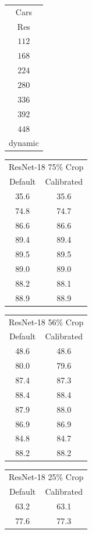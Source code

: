 \begin{table}[t]
    \centering
    \begin{tabular}{c|}
    Cars \\
    Res \\
    \hline
    $112$ \\ 
    $168$ \\ 
    $224$ \\ 
    $280$ \\ 
    $336$ \\ 
    $392$ \\ 
    $448$ \\
    dynamic\\
    \end{tabular}
    \begin{tabular}{|c|c|}
    \multicolumn{2}{|c|}{ ResNet-18 75\% Crop}\\
    Default & Calibrated \\
    \hline
    35.6 & 35.6 \\
    74.8 & 74.7\\ 
    86.6 & 86.6\\ 
    89.4 & 89.4\\ 
    89.5 & 89.5\\ 
    89.0 & 89.0\\ 
    88.2 & 88.1\\
    88.9 & 88.9\\ 
    \end{tabular}
    \begin{tabular}{|c|c|}
    \multicolumn{2}{|c|}{ ResNet-18 56\% Crop}\\
    Default & Calibrated  \\
    \hline
    48.6 & 48.6 \\ 
    80.0 & {\color{red}79.6}\\ 
    87.4 & 87.3 \\ 
    88.4 & 88.4 \\ 
    87.9 & 88.0 \\ 
    86.9 & 86.9 \\ 
    84.8 & 84.7\\
    88.2& 88.2 \\ 
    \end{tabular}
    \begin{tabular}{|c|c|}
    \multicolumn{2}{|c|}{ ResNet-18 25\% Crop}\\
    Default & Calibrated  \\
    \hline
    63.2 & 63.1 \\ 
    77.6 & {\color{red}77.3}\\ 

\end{tabular}
\end{table}
